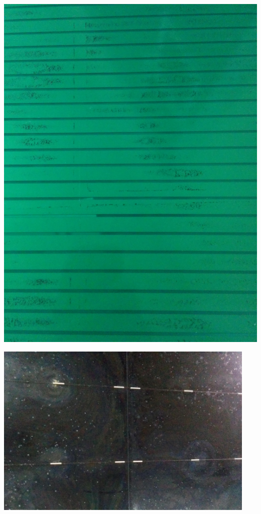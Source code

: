 \noindent
\begin{minipage}[th!]{1\textwidth}
	\addtocounter{figure}{1}
	\centering
	\noindent
	\begin{minipage}[th!]{0.48\textwidth}
		\noindent
		\centering
		\begin{minipage}[th!]{1\textwidth}
			\noindent
			\centering
			\includegraphics[width=1\textwidth]{GLA/peinture.jpg}
		\end{minipage}%
		\renewcommand\thesubfigure{\alph{subfigure}}
		\label{peinture}
	\end{minipage}%
	\hfill
	\begin{minipage}[th!]{0.48\textwidth}
		\noindent
		\centering
		\begin{minipage}[th!]{1\textwidth}
			\noindent
			\centering
			\includegraphics[width=0.94\textwidth]{GLA/perle.jpg}

\end{minipage}
\end{minipage}
\end{minipage}
